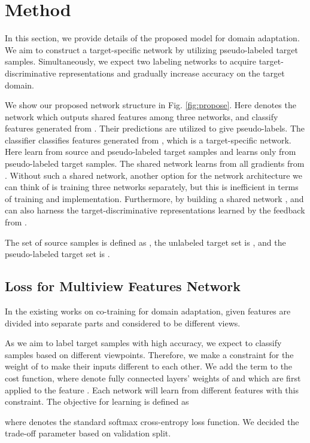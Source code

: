 \documentclass{article}
\begin{document}
\section{Method}
\vspace{-2mm}
In this section, we provide details of the proposed model for domain adaptation.
We aim to construct a target-specific network by utilizing pseudo-labeled target samples. Simultaneously, we expect two labeling networks to acquire target-discriminative representations and gradually increase accuracy on the target domain.

We show our proposed network structure in Fig. \ref{fig:propose}. Here
 denotes the network which outputs shared features among three networks,  and  classify features generated from . Their predictions are utilized to give pseudo-labels. The classifier  classifies features generated from , which is a target-specific network. Here  learn from source and pseudo-labeled target samples and  learns only from pseudo-labeled target samples. The shared network  learns from all gradients from . Without such a shared network, another option for the network architecture we can think of is training three networks separately, but this is inefficient in terms of training and implementation. Furthermore, by building a shared network ,  and  can also harness the target-discriminative representations learned by the feedback from .

The set of source samples is defined as , the unlabeled target set is , and the pseudo-labeled target set is .
\vspace{-2mm}
\subsection{Loss for Multiview Features Network}
In the existing works \cite{coda} on co-training for domain adaptation, given features are divided into separate parts and considered to be different views.

As we aim to label target samples with high accuracy, we expect  to classify samples based on different viewpoints.
Therefore, we make a constraint for the weight of  to make their inputs different to each other.
We add the term  to the cost function, where  denote fully connected layers' weights of  and  which are first applied to the feature . Each network will learn from different features with this constraint. The objective for learning  is defined as

where  denotes the standard softmax cross-entropy loss function. 
We decided the trade-off parameter  based on validation split.
\vspace{-2mm}
\end{document}
